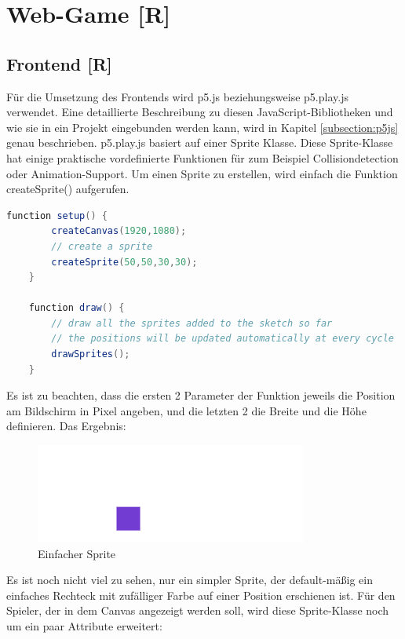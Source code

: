 \section{Web-Game [R]}
\subsection{Frontend [R]}
Für die Umsetzung des Frontends wird p5.js beziehungsweise p5.play.js verwendet.
Eine detaillierte Beschreibung zu diesen JavaScript-Bibliotheken und wie sie in ein Projekt eingebunden werden kann, wird in Kapitel \ref{subsection:p5js} genau beschrieben.
p5.play.js basiert auf einer Sprite Klasse. Diese Sprite-Klasse hat einige praktische vordefinierte Funktionen für zum Beispiel Collisiondetection oder Animation-Support.
Um einen Sprite zu erstellen, wird einfach die Funktion createSprite() aufgerufen.
\\
\begin{lstlisting}[language=Java,label=lst:impl:createSprite]
    function setup() {
        createCanvas(1920,1080);
        // create a sprite
        createSprite(50,50,30,30);
    }

    function draw() {
        // draw all the sprites added to the sketch so far
        // the positions will be updated automatically at every cycle
        drawSprites();
    }
\end{lstlisting}


Es ist zu beachten, dass die ersten 2 Parameter der Funktion jeweils die Position am Bildschirm in Pixel angeben, und die letzten 2 die Breite und die Höhe definieren.
Das Ergebnis:
\begin{figure}[H]
    \centering
    \includegraphics[scale=1]{pics/simpleSprite.PNG}
    \caption{Einfacher Sprite}
\end{figure}

Es ist noch nicht viel zu sehen, nur ein simpler Sprite, der default-mäßig ein einfaches Rechteck mit zufälliger Farbe auf einer Position erschienen ist.
Für den Spieler, der in dem Canvas angezeigt werden soll, wird diese Sprite-Klasse noch um ein paar Attribute erweitert:

